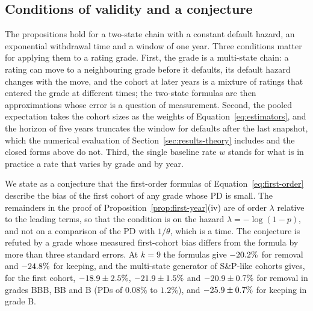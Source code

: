 \subsection{Conditions of validity and a conjecture}
\label{sec:theory-conjecture}

The propositions hold for a two-state chain with a constant default hazard, an exponential withdrawal time and a window of one year. Three conditions matter for applying them to a rating grade. First, the grade is a multi-state chain: a rating can move to a neighbouring grade before it defaults, its default hazard changes with the move, and the cohort at later years is a mixture of ratings that entered the grade at different times; the two-state formulas are then approximations whose error is a question of measurement. Second, the pooled expectation takes the cohort sizes as the weights of Equation~\eqref{eq:estimators}, and the horizon of five years truncates the window for defaults after the last snapshot, which the numerical evaluation of Section~\ref{sec:results-theory} includes and the closed forms above do not. Third, the single baseline rate $w$ stands for what is in practice a rate that varies by grade and by year.

We state as a conjecture that the first-order formulas of Equation~\eqref{eq:first-order} describe the bias of the first cohort of any grade whose PD is small. The remainders in the proof of Proposition~\ref{prop:first-year}(iv) are of order $\lambda$ relative to the leading terms, so that the condition is on the hazard $\lambda=-\log(1-p)$, and not on a comparison of the PD with $1/\theta$, which is a time. The conjecture is refuted by a grade whose measured first-cohort bias differs from the formula by more than three standard errors. At $k=9$ the formulas give $-20.2\%$ for removal and $-24.8\%$ for keeping, and the multi-state generator of S\&P-like cohorts gives, for the first cohort, $-18.9\pm2.5\%$, $-21.9\pm1.5\%$ and $-20.9\pm0.7\%$ for removal in grades BBB, BB and B (PDs of $0.08\%$ to $1.2\%$), and $-25.9\pm0.7\%$ for keeping in grade B.

